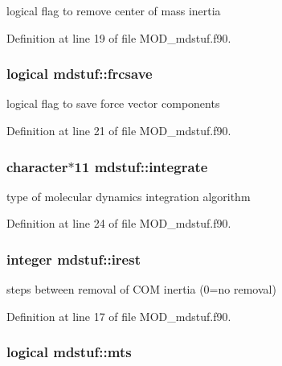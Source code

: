 logical flag to remove center of mass inertia 



Definition at line 19 of file M\-O\-D\-\_\-mdstuf.\-f90.

\hypertarget{classmdstuf_af3b89e8ce75c1382e23281a188302f52}{
\subsubsection[{frcsave}]{\setlength{\rightskip}{0pt plus 5cm}logical mdstuf\-::frcsave}}\label{classmdstuf_af3b89e8ce75c1382e23281a188302f52}


logical flag to save force vector components 



Definition at line 21 of file M\-O\-D\-\_\-mdstuf.\-f90.

\hypertarget{classmdstuf_af7e0b69126944da571344ddd7d2daef0}{
\subsubsection[{integrate}]{\setlength{\rightskip}{0pt plus 5cm}character$\ast$11 mdstuf\-::integrate}}\label{classmdstuf_af7e0b69126944da571344ddd7d2daef0}


type of molecular dynamics integration algorithm 



Definition at line 24 of file M\-O\-D\-\_\-mdstuf.\-f90.

\hypertarget{classmdstuf_a1dc401f98f77ddfccb057034b6b8a630}{
\subsubsection[{irest}]{\setlength{\rightskip}{0pt plus 5cm}integer mdstuf\-::irest}}\label{classmdstuf_a1dc401f98f77ddfccb057034b6b8a630}


steps between removal of C\-O\-M inertia (0=no removal) 



Definition at line 17 of file M\-O\-D\-\_\-mdstuf.\-f90.

\hypertarget{classmdstuf_a1d05be369fe503f113d843b3a8812e19}{
\subsubsection[{mts}]{\setlength{\rightskip}{0pt plus 5cm}logical mdstuf\-::mts}}\label{classmdstuf_a1d05be369fe503f113d843b3a8812e19}


